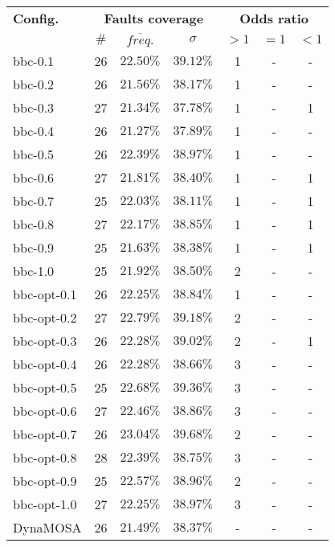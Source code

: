 \begin{tabular}{ l | c c c | c c c }
\textbf{Config.} & \multicolumn{3}{c|}{\textbf{Faults coverage}} & \multicolumn{3}{c}{\textbf{Odds ratio}} \\ 
  & $\#$ & $\overline{freq.}$ & $\sigma$ & $>1$ & $=1$ & $<1$ \\ 
\hline 
bbc-0.1 & 26 & $22.50\%$ & $39.12\%$ & 1 & - & - \\ 
bbc-0.2 & 26 & $21.56\%$ & $38.17\%$ & 1 & - & - \\ 
bbc-0.3 & 27 & $21.34\%$ & $37.78\%$ & 1 & - & 1 \\ 
bbc-0.4 & 26 & $21.27\%$ & $37.89\%$ & 1 & - & - \\ 
bbc-0.5 & 26 & $22.39\%$ & $38.97\%$ & 1 & - & - \\ 
bbc-0.6 & 27 & $21.81\%$ & $38.40\%$ & 1 & - & 1 \\ 
bbc-0.7 & 25 & $22.03\%$ & $38.11\%$ & 1 & - & 1 \\ 
bbc-0.8 & 27 & $22.17\%$ & $38.85\%$ & 1 & - & 1 \\ 
bbc-0.9 & 25 & $21.63\%$ & $38.38\%$ & 1 & - & 1 \\ 
bbc-1.0 & 25 & $21.92\%$ & $38.50\%$ & 2 & - & - \\ 
bbc-opt-0.1 & 26 & $22.25\%$ & $38.84\%$ & 1 & - & - \\ 
bbc-opt-0.2 & 27 & $22.79\%$ & $39.18\%$ & 2 & - & - \\ 
bbc-opt-0.3 & 26 & $22.28\%$ & $39.02\%$ & 2 & - & 1 \\ 
bbc-opt-0.4 & 26 & $22.28\%$ & $38.66\%$ & 3 & - & - \\ 
bbc-opt-0.5 & 25 & $22.68\%$ & $39.36\%$ & 3 & - & - \\ 
bbc-opt-0.6 & 27 & $22.46\%$ & $38.86\%$ & 3 & - & - \\ 
bbc-opt-0.7 & 26 & $23.04\%$ & $39.68\%$ & 2 & - & - \\ 
bbc-opt-0.8 & 28 & $22.39\%$ & $38.75\%$ & 3 & - & - \\ 
bbc-opt-0.9 & 25 & $22.57\%$ & $38.96\%$ & 2 & - & - \\ 
bbc-opt-1.0 & 27 & $22.25\%$ & $38.97\%$ & 3 & - & - \\ 
DynaMOSA & 26 & $21.49\%$ & $38.37\%$ & - & - & - \\ 
\end{tabular}
